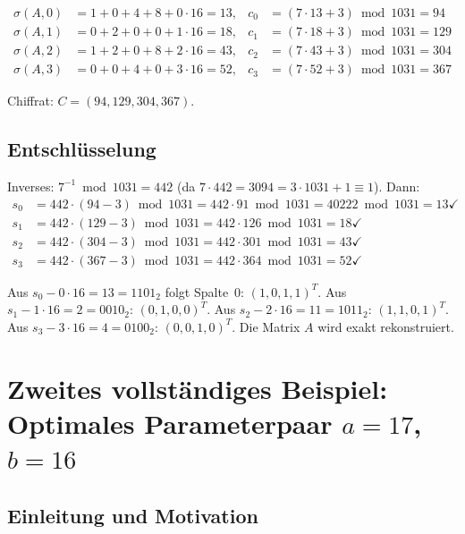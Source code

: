 ﻿\documentclass[a4paper,12pt]{scrreprt}
\theoremstyle{definition}
\begin{document}
\begin{align*}
	\sigma(A,0) &= 1{+}0{+}4{+}8 + 0 \cdot 16 = 13, & c_0 &= (7 \cdot 13 + 3) \bmod 1031 = 94 \\
	\sigma(A,1) &= 0{+}2{+}0{+}0 + 1 \cdot 16 = 18, & c_1 &= (7 \cdot 18 + 3) \bmod 1031 = 129 \\
	\sigma(A,2) &= 1{+}2{+}0{+}8 + 2 \cdot 16 = 43, & c_2 &= (7 \cdot 43 + 3) \bmod 1031 = 304 \\
	\sigma(A,3) &= 0{+}0{+}4{+}0 + 3 \cdot 16 = 52, & c_3 &= (7 \cdot 52 + 3) \bmod 1031 = 367
\end{align*}

Chiffrat: $C = (94, 129, 304, 367)$.

\subsection{Entschlüsselung}

Inverses: $7^{-1} \bmod 1031 = 442$ (da $7 \cdot 442 = 3094 = 3 \cdot 1031 + 1 \equiv 1$). Dann:
\begin{align*}
	s_0 &= 442 \cdot (94 - 3) \bmod 1031 = 442 \cdot 91 \bmod 1031 = 40222 \bmod 1031 = 13 \checkmark \\
	s_1 &= 442 \cdot (129 - 3) \bmod 1031 = 442 \cdot 126 \bmod 1031 = 18 \checkmark \\
	s_2 &= 442 \cdot (304 - 3) \bmod 1031 = 442 \cdot 301 \bmod 1031 = 43 \checkmark \\
	s_3 &= 442 \cdot (367 - 3) \bmod 1031 = 442 \cdot 364 \bmod 1031 = 52 \checkmark
\end{align*}

Aus $s_0 - 0 \cdot 16 = 13 = 1101_2$ folgt Spalte~0: $(1,0,1,1)^T$. Aus $s_1 - 1 \cdot 16 = 2 = 0010_2$: $(0,1,0,0)^T$. Aus $s_2 - 2 \cdot 16 = 11 = 1011_2$: $(1,1,0,1)^T$. Aus $s_3 - 3 \cdot 16 = 4 = 0100_2$: $(0,0,1,0)^T$. Die Matrix $A$ wird exakt rekonstruiert.

\section{Zweites vollständiges Beispiel: Optimales Parameterpaar $a=17$, $b=16$}
\label{sec:beispiel2}

\subsection{Einleitung und Motivation}
\end{document}
